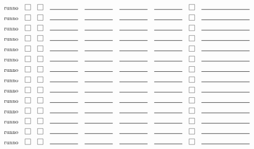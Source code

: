 \documentclass[12pt]{article}
\newcommand{\cbox}{\raisebox{.6ex}{\fbox{\rule{0in}{0.05in}\rule{0.05in}{0in}}}}
\newcommand{\eline}{\rule{0.7in}{0.01in}}
\newcommand{\cmline}{\rule{1.2in}{0.01in}}
\begin{document}
$$\begin{tabular}{lcccccccc}
runno & \cbox & \cbox & \eline & \eline & \eline & \eline & \cbox & \cmline \\[0.075in]
runno & \cbox & \cbox & \eline & \eline & \eline & \eline & \cbox & \cmline \\[0.075in]
runno & \cbox & \cbox & \eline & \eline & \eline & \eline & \cbox & \cmline \\[0.075in]
runno & \cbox & \cbox & \eline & \eline & \eline & \eline & \cbox & \cmline \\[0.075in]
runno & \cbox & \cbox & \eline & \eline & \eline & \eline & \cbox & \cmline \\[0.075in]
runno & \cbox & \cbox & \eline & \eline & \eline & \eline & \cbox & \cmline \\[0.075in]
runno & \cbox & \cbox & \eline & \eline & \eline & \eline & \cbox & \cmline \\[0.075in]
runno & \cbox & \cbox & \eline & \eline & \eline & \eline & \cbox & \cmline \\[0.075in]
runno & \cbox & \cbox & \eline & \eline & \eline & \eline & \cbox & \cmline \\[0.075in]
runno & \cbox & \cbox & \eline & \eline & \eline & \eline & \cbox & \cmline \\[0.075in]
runno & \cbox & \cbox & \eline & \eline & \eline & \eline & \cbox & \cmline \\[0.075in]
runno & \cbox & \cbox & \eline & \eline & \eline & \eline & \cbox & \cmline \\[0.075in]
runno & \cbox & \cbox & \eline & \eline & \eline & \eline & \cbox & \cmline \\[0.075in]
runno & \cbox & \cbox & \eline & \eline & \eline & \eline & \cbox & \cmline \\[0.075in]

\end{tabular}
$$
\end{document}
